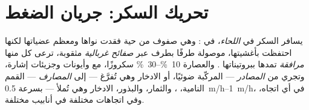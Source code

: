 \section{تحريك السكر: جريان الضغط}

\begin{definition}\label{def:b1:plant-transport:phloem}
يسافر السكر في \emph{اللحاء}، في \emph{}: وهي صفوف من
 حية فقدت نواها ومعظم عضياتها لكنها احتفظت بأغشيتها، موصولة
طرفًا بطرف عبر \emph{صفائح غربالية} مثقوبة، ترعى كل  منها
\emph{ مرافقة} تمدها ببروتيناتها . والعصارة
\qtyrange{10}{30}{\%} سكروزًا، مع  وأيونات وجزيئات
إشارة، وتجري من \emph{المصادر} ---  المركّبة ضوئيًا، أو 
الادخار وهي تُفرَّغ --- إلى \emph{المصارف} --- القمم النامية،
، والثمار، والبذور،  الادخار وهي تُملأ --- بسرعة
\qtyrange{0.5}{1}{m/h}، في أي اتجاه، وفي اتجاهات مختلفة في أنابيب
مختلفة.
\end{definition}

